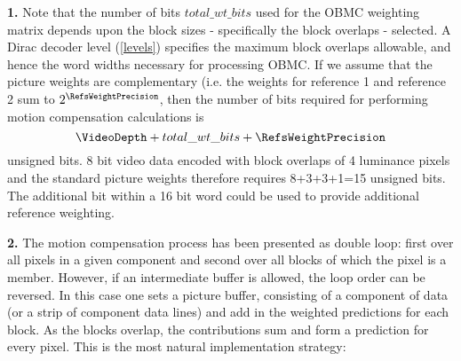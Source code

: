 \begin{informative}

{\bf 1.} Note that the number of bits $total\_wt\_bits$ used for the OBMC weighting matrix depends upon the block sizes - specifically
the block overlaps - selected. A Dirac decoder level (\ref{levels}) specifies the maximum block overlaps allowable, and hence 
the word widths necessary for processing OBMC. If we assume that the picture weights are complementary (i.e. the weights
for reference 1 and reference 2 sum to $2^\RefsWeightPrecision$, then the number of bits required for performing 
motion compensation 
calculations is
\[\VideoDepth+total\_wt\_bits+\RefsWeightPrecision\]
unsigned bits. 8 bit video data encoded with block overlaps of 4 luminance pixels and the standard picture weights therefore
requires 8+3+3+1=15 unsigned bits. The additional bit within a 16 bit word could be used to provide additional reference 
weighting.


{\bf 2.} The motion compensation process has been presented as double loop: first over all 
pixels in a given component and second over all blocks of which the pixel is a member. However, if an intermediate
buffer is allowed, the loop order can be reversed. In this case one sets a picture buffer, consisting of 
a component of data (or a strip of component data lines) and add in the weighted predictions for each block. As the
blocks overlap, the contributions sum and form a prediction for every pixel. This is the most natural implementation
strategy:

\begin{pseudo*}
            \bsELSE
            \bsEND
        \bsEND
    \bsEND
\bsEND
{}
    \bsEND
\bsEND
\end{pseudo*}


\end{informative}

